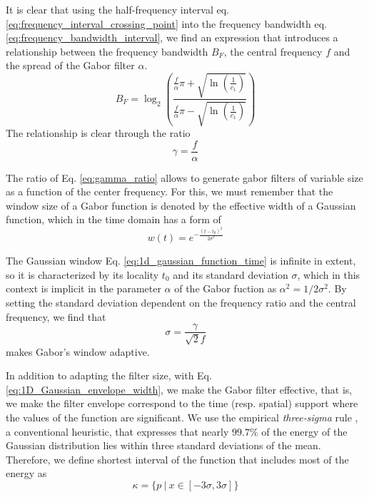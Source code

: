 It is clear that using the half-frequency interval eq. \eqref{eq:frequency_interval_crossing_point} into the frequency bandwidth eq. \eqref{eq:frequency_bandwidth_interval}, we find an expression that introduces a relationship between the frequency bandwidth $B_F$, the central frequency $f$ and the spread of the Gabor filter $\alpha$.
\begin{equation}\label{eq:frequency_bandwidth}
    B_F = \log_2 \left( \frac{ \frac{f}{\alpha} \pi + \sqrt{\ln \left(\frac{1}{c_1}\right)} }{ \frac{f}{\alpha} \pi - \sqrt{\ln \left(\frac{1}{c_1}\right)} } \right)
\end{equation}
The relationship is clear through the ratio 
\begin{equation}\label{eq:gamma_ratio}
    \gamma = \frac{f}{\alpha}
\end{equation}

The ratio of Eq. \ref{eq:gamma_ratio} allows to generate gabor filters of variable size as a function of the center frequency. For this, we must remember that the window size of a Gabor function is denoted by the effective width of a Gaussian function, which in the time domain has a form of
\begin{equation}\label{eq:1d_gaussian_function_time}
    w(t)=e^{-\frac{(t-t_0)^2}{2\sigma^2}}
\end{equation}

The Gaussian window Eq. \ref{eq:1d_gaussian_function_time} is infinite in extent, so it is characterized by its locality $t_0$ and its standard deviation $\sigma$, which in this context is implicit in the parameter $\alpha$ of the Gabor fuction as $\alpha^2 = 1 / 2 \sigma^2$. By setting the standard deviation dependent on the frequency ratio and the central frequency, we find that
\begin{equation}
	\sigma = \frac{\gamma}{\sqrt{2}f} \label{eq:1D_Gaussian_envelope_width}
\end{equation} 
makes Gabor's window adaptive.

In addition to adapting the filter size, with Eq. \eqref{eq:1D_Gaussian_envelope_width}, we make the Gabor filter effective, that is, we make the filter envelope correspond to the time (resp. spatial) support where the values of the function are significant. We use the empirical \textit{three-sigma} rule \cite{Pukelsheim:AMSTAT:1994}, a conventional heuristic, that expresses that nearly $99.7\%$ of the energy of the Gaussian distribution lies within three standard deviations of the mean. Therefore, we define shortest interval of the function that includes most of the energy as 
\begin{equation}
	\kappa = \lbrace p ~|~ x \in [-3\sigma, 3\sigma] \rbrace \label{eq:1D_gabor_support}
\end{equation}

